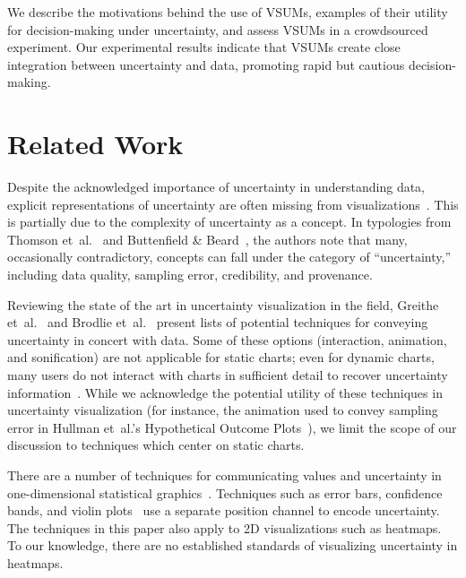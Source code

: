 \documentclass{vgtc}                          %
\newcommand{\ea}{{et~al.}\xspace}
\begin{document}
We describe the motivations behind the use of VSUMs, examples of their utility for decision-making under uncertainty, and assess VSUMs in a crowdsourced experiment. Our experimental results indicate that VSUMs create close integration between uncertainty and data, promoting rapid but cautious decision-making.

\exampleFig
\section{Related Work}


Despite the acknowledged importance of uncertainty in understanding data, explicit representations of uncertainty are often missing from visualizations~\cite{boukhelifa2009uncertainty}. This is partially due to the complexity of uncertainty as a concept. In typologies from Thomson \ea~\cite{thomson2005typology} and Buttenfield \& Beard~\cite{buttenfield1994graphical}, the authors note that many, occasionally contradictory, concepts can fall under the category of ``uncertainty,'' including data quality, sampling error, credibility, and provenance.

Reviewing the state of the art in uncertainty visualization in the field, Greithe \ea~\cite{griethe2006visualization} and Brodlie \ea~\cite{brodlie2012review} present lists of potential techniques for conveying uncertainty in concert with data. Some of these options (interaction, animation, and sonification) are not applicable for static charts; even for dynamic charts, many users do not interact with charts in sufficient detail to recover uncertainty information~\cite{nyt2016}. While we acknowledge the potential utility of these techniques in uncertainty visualization (for instance, the animation used to convey sampling error in Hullman \ea's Hypothetical Outcome Plots~\cite{hullman2015hypothetical}), we limit the scope of our discussion to techniques which center on static charts.

There are a number of techniques for communicating values and uncertainty in one-dimensional statistical graphics~\cite{olston2002visualizing, wickham201140, neyman1937outline}. Techniques such as error bars, confidence bands, and violin plots~\cite{hintze1998violin} use a separate position channel to encode uncertainty. The techniques in this paper also apply to 2D visualizations such as heatmaps. To our knowledge, there are no established standards of visualizing uncertainty in heatmaps.
\end{document}

